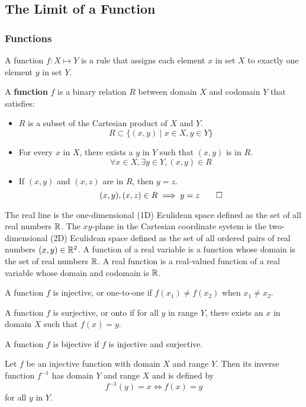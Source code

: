 \subsection{The Limit of a Function}

\subsubsection*{Functions}  
A function \(f:X\mapsto Y\) is a rule that assigns each element \(x\) in set
\(X\) to exactly one element \(y\) in set \(Y\).
\begin{definition}
    A \textbf{function} \(f\) is a binary relation \(R\) between domain \(X\)
    and codomain \(Y\) that satisfies:
    \begin{itemize}
        \item \(R\) is a subset of the Cartesian product of \(X\) and \(Y\).
        \[R\subset\{(x,y)\mid x\in X,y\in Y\}\]
        \item For every \(x\) in \(X\), there exists a \(y\) in \(Y\) such
        that \((x,y)\) is in \(R\).
        \[\forall x\in X,\exists y\in Y,(x,y)\in R\]
        \item If \((x,y)\) and \((x,z)\) are in \(R\), then \(y=z\).
        \[(x,y),(x,z)\in R\implies y=z\qedhere\]
    \end{itemize}
\end{definition}
The real line is the one-dimensional (1D) Eculidean space defined as the set
of all real numbers \(\mathbb{R}\).
The \(xy\)-plane in the Cartesian coordinate system is the two-dimensional
(2D) Eculidean space defined as the set of all ordered pairs of real numbers
\((x,y)\in\mathbb{R}^2\).
A function of a real variable is a function whose domain is the set of real
numbers \(\mathbb{R}\).
A real function is a real-valued function of a real variable whose domain and
codomain is \(\mathbb{R}\).
\begin{definition}
    A function \(f\) is injective, or one-to-one if \(f(x_1)\neq f(x_2)\) when
    \(x_1\neq x_2\).
\end{definition}
\begin{definition}
    A function \(f\) is surjective, or onto if for all \(y\) in range \(Y\),
    there exists an \(x\) in domain \(X\) such that \(f(x)=y\).
\end{definition}
\begin{definition}
    A function \(f\) is bijective if \(f\) is injective and surjective.
\end{definition}
\begin{definition}
    Let \(f\) be an injective function with domain \(X\) and range \(Y\).
    Then its inverse function \(f^{-1}\) has domain \(Y\) and range \(X\) and
    is defined by
    \[f^{-1}(y)=x\iff f(x)=y\]
    for all \(y\) in \(Y\).
\end{definition}

